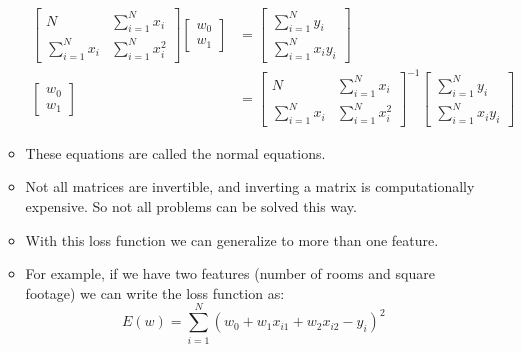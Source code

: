 \documentclass[12pt]{article}
\begin{document}
\begin{itemize}
\begin{itemize}
\begin{align*}
                            \begin{bmatrix}
                                N & \sum_{i=1}^N x_i\\
                                \sum_{i=1}^N x_i & \sum_{i=1}^N x_i^2
                            \end{bmatrix} \begin{bmatrix}
                                w_0\\
                                w_1
                            \end{bmatrix} &= \begin{bmatrix}
                                \sum_{i=1}^N y_i\\
                                \sum_{i=1}^N {x_i}y_i
                            \end{bmatrix}\\
                            \begin{bmatrix}
                                w_0\\
                                w_1
                            \end{bmatrix} &= \begin{bmatrix}
                                N & \sum_{i=1}^N x_i\\
                                \sum_{i=1}^N x_i & \sum_{i=1}^N x_i^2
                            \end{bmatrix}^{-1} \begin{bmatrix}
                                \sum_{i=1}^N y_i\\
                                \sum_{i=1}^N {x_i}y_i
                            \end{bmatrix}
                        \end{align*}
                        \item These equations are called the normal equations.
                        \item Not all matrices are invertible, and inverting a matrix is computationally expensive. So not all problems can be solved this way.
                        \item With this loss function we can generalize to more than one feature.
                        \item For example, if we have two features (number of rooms and square footage) we can write the loss function as:
                        \begin{equation}
                            E(w) = \sum_{i=1}^N {(w_0 + w_1x_{i1} + w_2x_{i2} - y_i)}^2

\end{equation}
\end{itemize}
\end{itemize}
\end{document}
